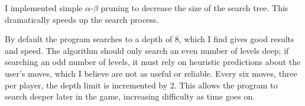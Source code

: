 \documentclass{article}
\begin{document}
I implemented simple $\alpha$-$\beta$ pruning to decrease the size of the search tree. This dramatically speeds up the search process.

By default the program searches to a depth of 8, which I find gives good results and speed. The algorithm should only search an even number of levels deep; if searching an odd number of
levels, it must rely on heuristic predictions about the user's moves, which I believe are not as useful or reliable. Every six moves, three per player, the depth limit is incremented by 2.
This allows the program to search deeper later in the game, increasing difficulty as time goes on.
\end{document}
